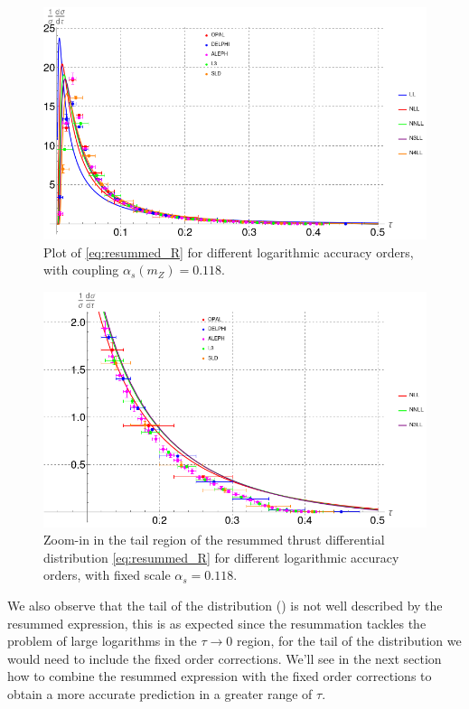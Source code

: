 \documentclass[../Tesi_Jiahao_Miao_986136.tex]{subfiles}
\begin{document}
\begin{figure}[htbp]
    \centering
    \includegraphics[width=\textwidth]{figures/Thrust_differential_distribution_with_xerr.png}
    \caption{Plot of \cref{eq:resummed_R} for different logarithmic accuracy orders, with coupling $\alpha_s(m_Z) = 0.118$.}
    \label{fig:Thrust distribution with data}
\end{figure}

\begin{figure}[htbp]
    \centering
    \includegraphics[width=\textwidth]{figures/Resummed_tail_region.png}
    \caption{Zoom-in in the tail region of the resummed thrust differential distribution \cref{eq:resummed_R} for different logarithmic accuracy orders, with fixed scale $\alpha_s = 0.118$.}
    \label{fig:resummed tail region}
\end{figure}

We also observe that the tail of the distribution () is not well described by the resummed expression, this is as expected since the resummation tackles the problem of large logarithms in the $\tau \to 0$ region,
for the tail of the distribution we would need to include the fixed order corrections. We'll see in the next section how to combine the resummed expression with the fixed order corrections to obtain a more accurate prediction
in a greater range of $\tau$.
\end{document}

